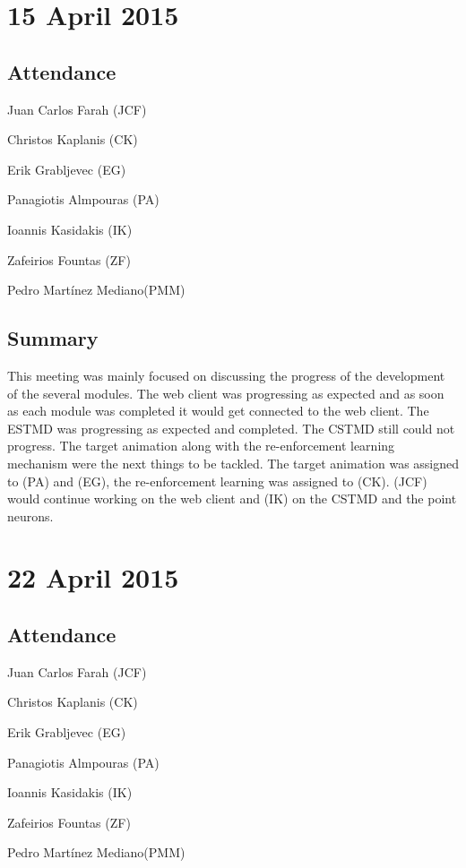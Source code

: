 \documentclass[a4paper,11pt]{article}
\begin{document}
\section*{15 April 2015}
\subsection*{Attendance}
\begin{compactenum}
\item Juan Carlos Farah (JCF)
\item Christos Kaplanis (CK)
\item Erik Grabljevec (EG)
\item Panagiotis Almpouras (PA)
\item Ioannis Kasidakis (IK)
\item Zafeirios Fountas (ZF)
\item Pedro Martínez Mediano(PMM)
\end{compactenum}

\subsection*{Summary}
This meeting was mainly focused on discussing the progress of the development of the several modules. The web client was progressing as expected and as soon as each module was completed it would get connected to the web client. The ESTMD was progressing as expected and completed. The CSTMD still could not progress. The target animation along with the re-enforcement learning mechanism were the next things to be tackled. The target animation was assigned to (PA) and (EG), the re-enforcement learning was assigned to (CK). (JCF) would continue working on the web client and (IK) on the CSTMD and the point neurons.

\maketitle
\section*{22 April 2015}
\subsection*{Attendance}
\begin{compactenum}
\item Juan Carlos Farah (JCF)
\item Christos Kaplanis (CK)
\item Erik Grabljevec (EG)
\item Panagiotis Almpouras (PA)
\item Ioannis Kasidakis (IK)
\item Zafeirios Fountas (ZF)
\item Pedro Martínez Mediano(PMM)
\end{compactenum}
\end{document}
